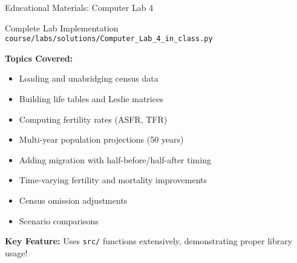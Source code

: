 \documentclass[aspectratio=169]{beamer}
\begin{document}
\begin{frame}{Educational Materials: Computer Lab 4}
\begin{block}{Complete Lab Implementation}
\texttt{course/labs/solutions/Computer\_Lab\_4\_in\_class.py}
\end{block}

\textbf{Topics Covered:}
\begin{itemize}
    \item Loading and unabridging census data
    \item Building life tables and Leslie matrices
    \item Computing fertility rates (ASFR, TFR)
    \item Multi-year population projections (50 years)
    \item Adding migration with half-before/half-after timing
    \item Time-varying fertility and mortality improvements
    \item Census omission adjustments
    \item Scenario comparisons
\end{itemize}

\vspace{0.2cm}

\textbf{Key Feature:} Uses \textcolor{successgreen}{\texttt{src/}} functions extensively, demonstrating proper library usage!
\end{frame}
\end{document}
